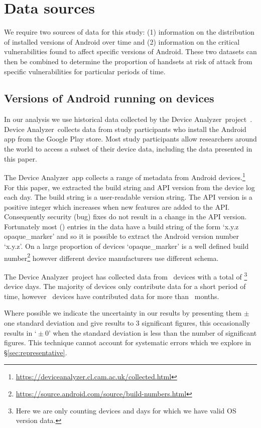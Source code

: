 \documentclass{llncs}
\newcommand{\da}{Device Analyzer}
\newcommand{\daNumDevices}{\daNumOSDevices}
\newcommand{\daDeviceDays}{\daOSTotalDaysData}
\begin{document}
\section{Data sources}
\label{sec:background}

We require two sources of data for this study: (1) information on the distribution of installed versions of Android over time and (2) information on the critical vulnerabilities found to affect specific versions of Android.
These two datasets can then be combined to determine the proportion of handsets at risk of attack from specific vulnerabilities for particular periods of time.

\subsection{Versions of Android running on devices}

In our analysis we use historical data collected by the \da\ project~\cite{Wagner2013}.
\da\ collects data from study participants who install the Android app from the Google Play store.
Most study participants allow researchers around the world to access a subset of their device data, including the data presented in this paper.

The \da\ app collects a range of metadata from Android devices.\footnote{\url{https://deviceanalyzer.cl.cam.ac.uk/collected.html}}
For this paper, we extracted the build string and API version from the device log each day.
The build string is a user-readable version string.
The API version is a positive integer which increases when new features are added to the API.
Consequently security (bug) fixes do not result in a change in the API version.
Fortunately most (\daOSVersionPercValidLines) entries in the data have a build string of the form `x.y.z opaque\_marker' and so it is possible to extract the Android version number `x.y.z'.
On a large proportion of devices `opaque\_marker' is a well defined build number\footnote{\url{https://source.android.com/source/build-numbers.html}} however different device manufacturers use different schema.

The \da\ project has collected data from \daNumDevices\ devices with a total of \daDeviceDays\footnote{Here we are only counting devices and days for which we have valid OS version data.} device days.
The majority of devices only contribute data for a short period of time, however \daMonthsDevices\ devices have contributed data for more than \daMonths~months.

Where possible we indicate the uncertainty in our results by presenting them $\pm$ one standard deviation and give results to 3 significant figures, this occasionally results in `${} \pm 0$' when the standard deviation is less than the number of significant figures.
This technique cannot account for systematic errors which we explore in \S\ref{sec:representative}.
\end{document}
